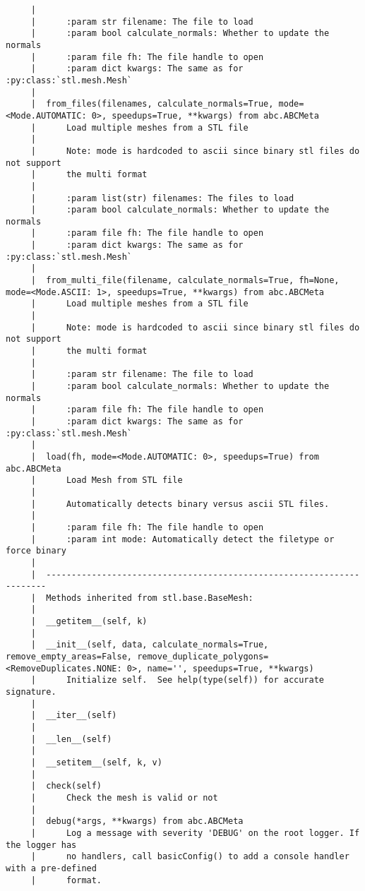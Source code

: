 \documentclass[12pt,fleqn]{article}\usepackage{../../common}
\begin{document}
\begin{verbatim}
     |      
     |      :param str filename: The file to load
     |      :param bool calculate_normals: Whether to update the normals
     |      :param file fh: The file handle to open
     |      :param dict kwargs: The same as for :py:class:`stl.mesh.Mesh`
     |  
     |  from_files(filenames, calculate_normals=True, mode=<Mode.AUTOMATIC: 0>, speedups=True, **kwargs) from abc.ABCMeta
     |      Load multiple meshes from a STL file
     |      
     |      Note: mode is hardcoded to ascii since binary stl files do not support
     |      the multi format
     |      
     |      :param list(str) filenames: The files to load
     |      :param bool calculate_normals: Whether to update the normals
     |      :param file fh: The file handle to open
     |      :param dict kwargs: The same as for :py:class:`stl.mesh.Mesh`
     |  
     |  from_multi_file(filename, calculate_normals=True, fh=None, mode=<Mode.ASCII: 1>, speedups=True, **kwargs) from abc.ABCMeta
     |      Load multiple meshes from a STL file
     |      
     |      Note: mode is hardcoded to ascii since binary stl files do not support
     |      the multi format
     |      
     |      :param str filename: The file to load
     |      :param bool calculate_normals: Whether to update the normals
     |      :param file fh: The file handle to open
     |      :param dict kwargs: The same as for :py:class:`stl.mesh.Mesh`
     |  
     |  load(fh, mode=<Mode.AUTOMATIC: 0>, speedups=True) from abc.ABCMeta
     |      Load Mesh from STL file
     |      
     |      Automatically detects binary versus ascii STL files.
     |      
     |      :param file fh: The file handle to open
     |      :param int mode: Automatically detect the filetype or force binary
     |  
     |  ----------------------------------------------------------------------
     |  Methods inherited from stl.base.BaseMesh:
     |  
     |  __getitem__(self, k)
     |  
     |  __init__(self, data, calculate_normals=True, remove_empty_areas=False, remove_duplicate_polygons=<RemoveDuplicates.NONE: 0>, name='', speedups=True, **kwargs)
     |      Initialize self.  See help(type(self)) for accurate signature.
     |  
     |  __iter__(self)
     |  
     |  __len__(self)
     |  
     |  __setitem__(self, k, v)
     |  
     |  check(self)
     |      Check the mesh is valid or not
     |  
     |  debug(*args, **kwargs) from abc.ABCMeta
     |      Log a message with severity 'DEBUG' on the root logger. If the logger has
     |      no handlers, call basicConfig() to add a console handler with a pre-defined
     |      format.

\end{verbatim}
\end{document}
